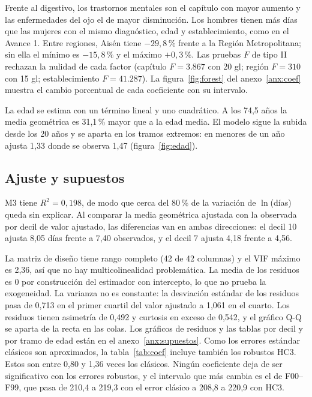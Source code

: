 \documentclass[10.5pt,a4paper,headings=small,abstract=false,bibliography=totoc,listof=totoc]{scrartcl}
\newcommand{\pct}{\,\%}
\newcommand{\anexo}[1]{anexo~\ref{#1}}
\begin{document}
Frente al digestivo, los trastornos mentales son el capítulo con mayor aumento y las enfermedades del ojo el de mayor disminución. Los hombres tienen más días que las mujeres con el mismo diagnóstico, edad y establecimiento, como en el Avance 1. Entre regiones, Aisén tiene $-29{,}8\pct{}$ frente a la Región Metropolitana; sin ella el mínimo es $-15{,}8\pct{}$ y el máximo $+0{,}3\pct{}$. Las pruebas $F$ de tipo II rechazan la nulidad de cada factor (capítulo $F=3.867$ con 20 gl; región $F=310$ con 15 gl; establecimiento $F=41.287$). La figura~\ref{fig:forest} del \anexo{anx:coef} muestra el cambio porcentual de cada coeficiente con su intervalo.

La edad se estima con un término lineal y uno cuadrático. A los 74,5 años la media geométrica es 31,1\pct{} mayor que a la edad media. El modelo sigue la subida desde los 20 años y se aparta en los tramos extremos: en menores de un año ajusta 1,33 donde se observa 1,47 (figura~\ref{fig:edad}).

\subsection{Ajuste y supuestos}

M3 tiene $R^2=0{,}198$, de modo que cerca del 80\pct{} de la variación de $\ln$(días) queda sin explicar. Al comparar la media geométrica ajustada con la observada por decil de valor ajustado, las diferencias van en ambas direcciones: el decil 10 ajusta 8,05 días frente a 7,40 observados, y el decil 7 ajusta 4,18 frente a 4,56.

La matriz de diseño tiene rango completo (42 de 42 columnas) y el VIF máximo es 2,36, así que no hay multicolinealidad problemática. La media de los residuos es 0 por construcción del estimador con intercepto, lo que no prueba la exogeneidad. La varianza no es constante: la desviación estándar de los residuos pasa de 0,713 en el primer cuartil del valor ajustado a 1,061 en el cuarto. Los residuos tienen asimetría de 0,492 y curtosis en exceso de 0,542, y el gráfico Q-Q se aparta de la recta en las colas. Los gráficos de residuos y las tablas por decil y por tramo de edad están en el \anexo{anx:supuestos}. Como los errores estándar clásicos son aproximados, la tabla~\ref{tab:coef} incluye también los robustos HC3. Estos son entre 0,80 y 1,36 veces los clásicos. Ningún coeficiente deja de ser significativo con los errores robustos, y el intervalo que más cambia es el de F00--F99, que pasa de 210,4 a 219,3 con el error clásico a 208,8 a 220,9 con HC3.
\end{document}
